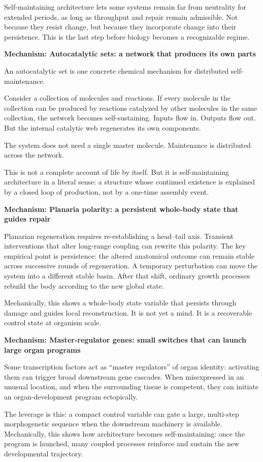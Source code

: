 \documentclass[11pt,twoside,openright]{book}
\newenvironment{mechanismbox}[1]
  {\begin{framed}\noindent\textbf{Mechanism: #1}\par\medskip}
  {\end{framed}}
\begin{document}
Self-maintaining architecture lets some systems remain far from neutrality for extended periods, as long as throughput and repair remain admissible. Not because they resist change, but because they incorporate change into their persistence. This is the last step before biology becomes a recognizable regime.

\begin{mechanismbox}{Autocatalytic sets: a network that produces its own parts}
An autocatalytic set is one concrete chemical mechanism for distributed self-maintenance.

Consider a collection of molecules and reactions. If every molecule in the collection can be produced by reactions catalyzed by other molecules in the same collection, the network becomes self-sustaining. Inputs flow in. Outputs flow out. But the internal catalytic web regenerates its own components.

The system does not need a single master molecule. Maintenance is distributed across the network.

This is not a complete account of life by itself.
But it is self-maintaining architecture in a literal sense:
a structure whose continued existence is explained by a closed loop of production, not by a one-time assembly event.
\end{mechanismbox}
\begin{mechanismbox}{Planaria polarity: a persistent whole-body state that guides repair}

Planarian regeneration requires re-establishing a head--tail axis. Transient interventions that alter long-range coupling can rewrite this polarity. The key empirical point is persistence: the altered anatomical outcome can remain stable across successive rounds of regeneration. A temporary perturbation can move the system into a different stable basin. After that shift, ordinary growth processes rebuild the body according to the new global state.

Mechanically, this shows a whole-body state variable that persists through damage and guides local reconstruction. It is not yet a mind. It is a recoverable control state at organism scale.

\end{mechanismbox}
\begin{mechanismbox}{Master-regulator genes: small switches that can launch large organ programs}
Some transcription factors act as ``master regulators'' of organ identity: activating them can trigger broad downstream gene cascades.
When misexpressed in an unusual location,
and when the surrounding tissue is competent,
they can initiate an organ-development program ectopically.

The leverage is this:
a compact control variable can gate a large, multi-step morphogenetic sequence
when the downstream machinery is available.
Mechanically, this shows how architecture becomes self-maintaining: once the program is launched, many coupled processes reinforce and sustain the new developmental trajectory.
\end{mechanismbox}
\end{document}
